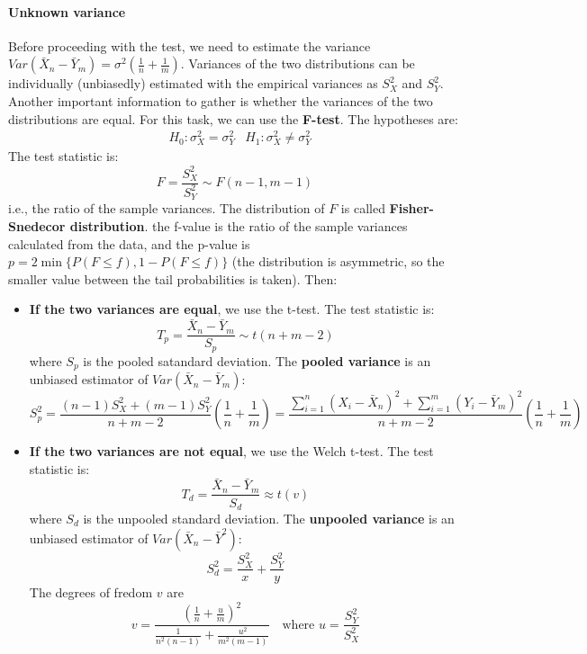 \paragraph{Unknown variance}
Before proceeding with the test, we need to estimate the variance $Var(\bar{X}_n - \bar{Y}_m) = \sigma^2\left(\frac{1}{n} + \frac{1}{m}\right)$. Variances of the two distributions can be individually (unbiasedly) estimated with the empirical variances as $S_X^2$ and $S_Y^2$. Another important information to gather is whether the variances of the two distributions are equal. For this task, we can use the \textbf{F-test}. The hypotheses are:
\begin{align*}
    &H_0 : \sigma_X^2 = \sigma_Y^2 &H_1 : \sigma_X^2 \not = \sigma_Y^2
\end{align*}
The test statistic is:
\begin{equation*}
    F = \frac{S_X^2}{S_Y^2} \sim F(n-1, m-1)
\end{equation*}
i.e., the ratio of the sample variances. The distribution of $F$ is called \textbf{Fisher-Snedecor distribution}. the f-value is the ratio of the sample variances calculated from the data, and the p-value is $p = 2 \min \{ P(F \leq f), 1 - P(F \leq f) \}$ (the distribution is asymmetric, so the smaller value between the tail probabilities is taken).
Then:
\begin{itemize}
    \item \textbf{If the two variances are equal}, we use the t-test. The test statistic is:
    \begin{equation*}
        T_p = \frac{\bar{X}_n - \bar{Y}_m}{S_p} \sim t(n+m-2)
    \end{equation*}
    where $S_p$ is the pooled satandard deviation. The \textbf{pooled variance} is an unbiased estimator of $Var(\bar{X}_n - \bar{Y}_m)$:
    \begin{equation*}
        S_p^2 = \frac{(n-1) S_X^2 + (m-1) S_Y^2}{n+m-2} \left(\frac{1}{n} + \frac{1}{m}\right) = \frac{\sum_{i=1}^n (X_i - \bar{X}_n)^2 + \sum_{i=1}^m (Y_i - \bar{Y}_m)^2}{n+m-2} \left(\frac{1}{n} + \frac{1}{m}\right)
    \end{equation*}

    \item \textbf{If the two variances are not equal}, we use the Welch t-test. The test statistic is:
    \begin{equation*}
        T_d = \frac{\bar{X}_n - \bar{Y}_m}{S_d} \approx t(v)
    \end{equation*}
    where $S_d$ is the unpooled standard deviation. The \textbf{unpooled variance} is an unbiased estimator of $Var(\bar{X}_n - \bar{Y}^2)$:
    \begin{equation*}
        S_d^2 = \frac{S_X^2}{x} + \frac{S_Y^2}{y}
    \end{equation*}
    The degrees of fredom $v$ are 
    \begin{equation*}
        v = \frac{\left(\frac{1}{n} + \frac{u}{m}\right)^2}{\frac{1}{n^2(n-1)} + \frac{u^2}{m^2(m-1)}} \quad \text{where } u = \frac{S_Y^2}{S_X^2}
    \end{equation*}
\end{itemize}

